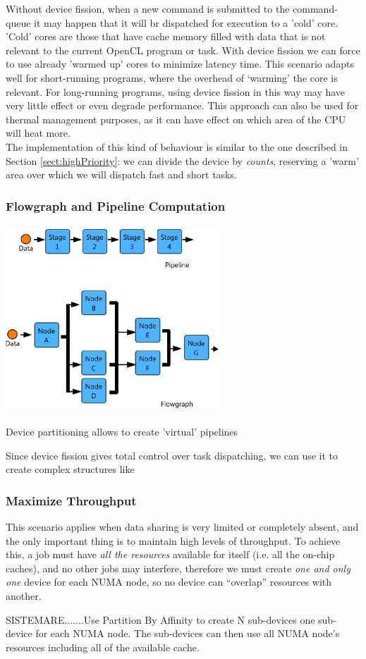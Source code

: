 Without device fission, when a new command is submitted to the command-queue it may happen that it will br dispatched for execution to a 'cold' core. 'Cold' cores are those that have cache memory filled with data that is not relevant to the current OpenCL program or task. With device fission we can force to use already 'warmed up' cores to minimize latency time.
This scenario adapts well for short-running programs, where the overhead of `warming' the core is relevant. For long-running programs, using device fission in this way may have very little effect or even degrade performance.
This approach can also be used for thermal management purposes, as it can have effect on which area of the CPU will heat more.\\
The implementation of this kind of behaviour is similar to the one described in Section \ref{sect:highPriority}: we can divide the device by \textit{counts}, reserving a 'warm' area over which we will dispatch fast and short tasks.

\subsubsection{Flowgraph and Pipeline Computation} \label{sect:pipelineScenario}

\begin{figurehere}
 \centering
 \includegraphics[width=8cm, height=7cm]{./eps/flow.eps}
 \caption{Device partitioning allows to create 'virtual' pipelines}
 \label{fig:flow}
\end{figurehere}

Since device fission gives total control over task dispatching, we can use it to create complex structures like 


\subsubsection{Maximize Throughput}
This scenario applies when data sharing is very limited or completely absent, and the only important thing is to maintain high levels of throughput. To achieve this, a job must have \textit{all the resources} available for itself (i.e. all the on-chip caches), and no other jobs may interfere, therefore we must create \emph{one and only one} device for each NUMA node, so no device can "`overlap"' resources with another.

SISTEMARE.......Use Partition By Affinity to create N sub-devices one sub-device for each NUMA node.
The sub-devices can then use all NUMA node's resources including all of the available cache.







